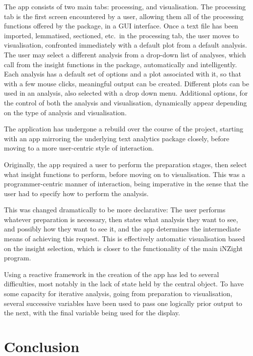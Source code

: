 \message{ !name(jason-cairns-dissertation.tex)}\documentclass[11pt, a4paper, titlepage]{report}
\begin{document}
The app consists of two main tabs: processing, and visualisation. The
processing tab is the first screen encountered by a user, allowing
them all of the processing functions offered by the package, in a GUI
interface. Once a text file has been imported, lemmatised, sectioned,
etc.\ in the processing tab, the user moves to visualisation,
confronted immediately with a default plot from a default analysis.
The user may select a different analysis from a drop-down list of
analyses, which call from the insight functions in the package,
automatically and intelligently. Each analysis has a default set of
options and a plot associated with it, so that with a few mouse
clicks, meaningful output can be created. Different plots can be used
in an analysis, also selected with a drop down menu. Additional
options, for the control of both the analysis and visualisation,
dynamically appear depending on the type of analysis and
visualisation.

The application has undergone a rebuild over the course of the project,
starting with an app mirroring the underlying text analytics package
closely, before moving to a more user-centric style of interaction.

Originally, the app required a user to perform the preparation stages,
then select what insight functions to perform, before moving on to
visualisation. This was a programmer-centric manner of interaction,
being imperative in the sense that the user had to specify how to
perform the analysis.

This was changed dramatically to be more declarative: The user
performs whatever preparation is necessary, then states what analysis
they want to see, and possibly how they want to see it, and the app
determines the intermediate means of achieving this request. This is
effectively automatic visualisation based on the insight selection,
which is closer to the functionality of the main iNZight program.

Using a reactive framework in the creation of the app has led to
several difficulties, most notably in the lack of state held by the
central object. To have some capacity for iterative analysis, going
from preparation to visualisation, several successive variables have
been used to pass one logically prior output to the next, with the
final variable being used for the display.

\chapter{Conclusion}\label{cha:conclusion}
\end{document}
